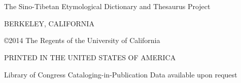 \chapter*{}
\vspace{25em}
\thispagestyle{empty}
\begin{center}
The Sino-Tibetan Etymological Dictionary and Thesaurus Project

BERKELEY, CALIFORNIA

\copyright 2014 The Regents of the University of California

PRINTED IN THE UNITED STATES OF AMERICA

Library of Congress Cataloging-in-Publication Data available upon request


\vspace{10em}
\date{Compiled on \today\ at \currenttime}
\end{center}



